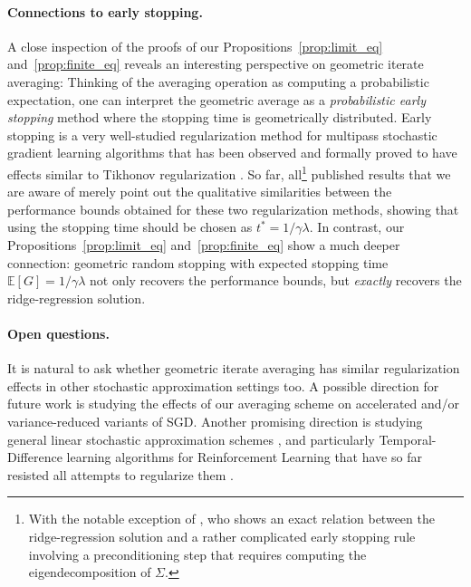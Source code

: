 \documentclass[final,12pt]{colt2018} %
\newcommand{\EE}[1]{\mathbb{E}\left[#1\right]}
\begin{document}
\paragraph{Connections to early stopping.} A close inspection of the proofs of our Propositions~\ref{prop:limit_eq} 
and~\ref{prop:finite_eq} reveals an interesting perspective on geometric iterate averaging: Thinking of the averaging operation as 
computing a probabilistic expectation, one can interpret the geometric average as a \emph{probabilistic early stopping} method where the 
stopping time is geometrically distributed. Early stopping is a very well-studied regularization method for multipass stochastic gradient 
learning algorithms that has been observed and formally proved to have effects similar to Tikhonov regularization \citep{YRC07, RV15}. So 
far, all\footnote{With the notable exception of \citet{Fle90}, who shows an exact relation between the ridge-regression solution 
and a rather complicated early stopping rule involving a preconditioning step that requires computing the eigendecomposition of $\Sigma$.} 
published results that we are aware of merely point out the qualitative similarities between the performance bounds obtained for these two 
regularization methods, showing that using the stopping time should be chosen as $t^* = 1/\gamma \lambda$. In contrast, our 
Propositions~\ref{prop:limit_eq} and~\ref{prop:finite_eq} show a much deeper connection: geometric random stopping with expected stopping 
time $\EE{G} = 1/\gamma\lambda$ not only recovers the performance bounds, but \emph{exactly} recovers the ridge-regression solution. 


\paragraph{Open questions.} It is natural to ask whether geometric iterate averaging has similar regularization effects in other stochastic 
approximation settings too. A possible direction for future work is studying the effects of our averaging scheme on accelerated and/or 
variance-reduced variants of SGD.
 Another promising direction is studying general linear stochastic approximation 
schemes \citep{LS18}, and particularly Temporal-Difference learning algorithms for Reinforcement Learning that have so far resisted all 
attempts to regularize them \citep{SB98,S10,F11}.
\end{document}
